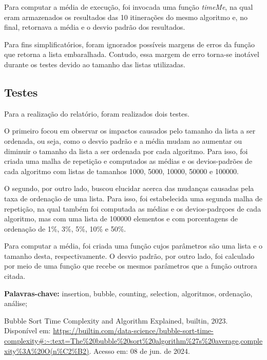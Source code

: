 \documentclass[10pt,a4paper]{article}
\begin{document}
Para computar a média de execução, foi invocada uma função \textit{timeMe}, na qual eram armazenados os resultados das 10 itinerações do mesmo algoritmo e, no final, retornava a média e o desvio padrão dos resultados.

Para fins simplificatórios, foram ignorados possíveis margens de erros da função que retorna a lista embaralhada. Contudo, essa margem de erro torna-se inotável durante os testes devido ao tamanho das listas utilizadas.
\subsection{Testes}
    Para a realização do relatório, foram realizados dois testes. 
    
    O primeiro focou em observar os impactos causados pelo tamanho da lista a ser ordenada, ou seja, como o desvio padrão e a média mudam ao aumentar ou diminuir o tamanho da lista a ser ordenada por cada algoritmo. 
    Para isso, foi criada uma malha de repetição e computados as médias e os devios-padrões de cada algoritmo com listas de tamanhos 1000, 5000, 10000, 50000 e 100000.
    
    O segundo, por outro lado, buscou elucidar acerca das mudanças causadas pela taxa de ordenação de uma lista.
    Para isso, foi estabelecida uma segunda malha de repetição, na qual também foi computada as médias e os devios-padrçoes de cada algoritmo, mas com uma lista de 100000 elementos e com porcentagens de ordenação de 1\%, 3\%, 5\%, 10\% e 50\%.
    

    Para computar a média, foi criada uma função cujos parâmetros são uma lista e o tamanho desta, respectivamente. O desvio padrão, por outro lado, foi calculado por meio de uma função que recebe os mesmos parâmetros que a função outrora citada.
    

\noindent\textbf{Palavras-chave:} insertion, bubble, counting, selection, algoritmos, ordenação, análise;

\newpage
\tableofcontents










\begin{thebibliography}{3}
    Bubble Sort Time Complexity and Algorithm Explained, builtin, 2023. Disponível em: \url{https://builtin.com/data-science/bubble-sort-time-complexity#:~:text=The%20bubble%20sort%20algorithm%27s%20average,complexity%3A%20O(n%C2%B2)}. Acesso em: 08 de jun. de 2024.
\end{thebibliography}
\end{document}
